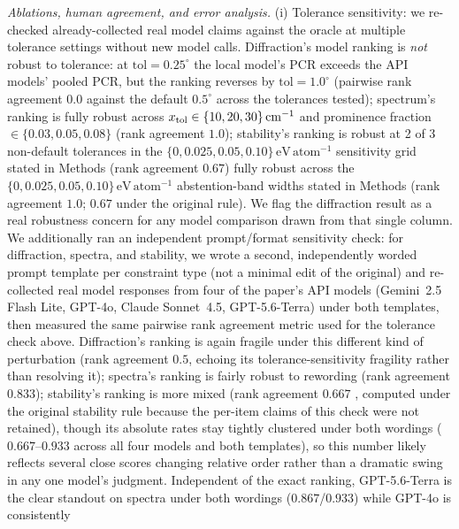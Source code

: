 \documentclass[pdflatex,sn-nature]{sn-jnl}
\newcommand{\rev}[1]{#1} %
\newcommand{\rev}[1]{{\color{blue}#1}} %
\providecommand{\DIFadd}[1]{{\protect\color{blue} \sf #1}} %
\providecommand{\DIFdel}[1]{{\protect\color{red} \scriptsize #1}} %
\providecommand{\DIFaddbegin}{} %
\providecommand{\DIFaddend}{} %
\providecommand{\DIFdelbegin}{} %
\providecommand{\DIFdelend}{} %
\providecommand{\DIFscaledelfig}{0.5}
\newlength{\DIFdelgraphicswidth} %
\newlength{\DIFdelgraphicsheight} %
\providecommand{\DIFaddincludegraphics}[2][]{{\color{blue}\fbox{\DIFOincludegraphics[#1]{#2}}}} %
\providecommand{\DIFdelincludegraphics}[2][]{%
\sbox{\DIFdelgraphicsbox}{\DIFOincludegraphics[#1]{#2}}%
\settoboxwidth{\DIFdelgraphicswidth}{\DIFdelgraphicsbox} %
\settoboxtotalheight{\DIFdelgraphicsheight}{\DIFdelgraphicsbox} %
\scalebox{\DIFscaledelfig}{%
\parbox[b]{\DIFdelgraphicswidth}{\usebox{\DIFdelgraphicsbox}\\[-\baselineskip] \rule{\DIFdelgraphicswidth}{0em}}\llap{\resizebox{\DIFdelgraphicswidth}{\DIFdelgraphicsheight}{%
\setlength{\unitlength}{\DIFdelgraphicswidth}%
\begin{picture}(1,1)%
\thicklines\linethickness{2pt} %
{\color[rgb]{1,0,0}\put(0,0){\framebox(1,1){}}}%
{\color[rgb]{1,0,0}\put(0,0){\line( 1,1){1}}}%
{\color[rgb]{1,0,0}\put(0,1){\line(1,-1){1}}}%
\end{picture}%
}\hspace*{3pt}}} %
} %
\DeclareRobustCommand{\DIFaddbegin}{\DIFOaddbegin \let\includegraphics\DIFaddincludegraphics} %
\DeclareRobustCommand{\DIFaddend}{\DIFOaddend \let\includegraphics\DIFOincludegraphics} %
\DeclareRobustCommand{\DIFdelbegin}{\DIFOdelbegin \let\includegraphics\DIFdelincludegraphics} %
\DeclareRobustCommand{\DIFdelend}{\DIFOaddend \let\includegraphics\DIFOincludegraphics} %
\begin{document}
\noindent\emph{Ablations, human agreement, and error analysis.} (i) Tolerance sensitivity:
we re-checked already-collected real model claims against the oracle at multiple tolerance
settings without new model calls. Diffraction's model ranking is \emph{not} robust to
tolerance: at $\mathrm{tol}=0.25^\circ$ the local model's PCR exceeds the API models'
pooled PCR, but the ranking reverses by $\mathrm{tol}=1.0^\circ$ (pairwise rank agreement
$0.0$ against the default $0.5^\circ$ across the tolerances tested); spectrum's ranking is
fully robust across $x_{\rm tol}\in\{10,20,30\}\,\mathrm{cm}^{-1}$ and prominence fraction
$\in\{0.03,0.05,0.08\}$ (rank agreement $1.0$); stability's ranking is \DIFdelbegin \DIFdel{robust at 2 of 3
non-default tolerances in the $\{0,0.025,0.05,0.10\}\,\mathrm{eV\,atom^{-1}}$ sensitivity
grid stated in Methods (rank agreement $0.67$)}\DIFdelend \DIFaddbegin \DIFadd{\rev{fully robust across the
$\{0,0.025,0.05,0.10\}\,\mathrm{eV\,atom^{-1}}$ abstention-band widths stated in Methods (rank agreement
$1.0$; $0.67$ under the original rule)}}\DIFaddend . We flag the diffraction result as a real robustness concern
for any model comparison drawn from that single column. We additionally ran an independent
prompt/format sensitivity check: for diffraction, spectra, and stability, we wrote a second,
independently worded prompt template per constraint type (not a minimal edit of the
original) and re-collected real model responses from four of the paper's API models
(Gemini~2.5 Flash Lite, GPT-4o, Claude Sonnet~4.5, GPT-5.6-Terra) under both templates, then
measured the same pairwise rank agreement metric used for the tolerance check above.
Diffraction's ranking is again fragile under this different kind of perturbation (rank
agreement $0.5$, echoing its tolerance-sensitivity fragility rather than resolving it);
spectra's ranking is fairly robust to rewording (rank agreement $0.833$); stability's ranking
is more mixed (rank agreement $0.667$\DIFaddbegin \DIFadd{\rev{, computed under the original stability rule because the per-item
claims of this check were not retained}}\DIFaddend ), though its absolute rates stay tightly clustered
under both wordings ($0.667$--$0.933$ across all four models and both templates), so this
number likely reflects several close scores changing relative order rather than a dramatic
swing in any one model's judgment. Independent of the exact ranking, GPT-5.6-Terra is the
clear standout on spectra under both wordings ($0.867$/$0.933$) while GPT-4o is consistently
\end{document}
